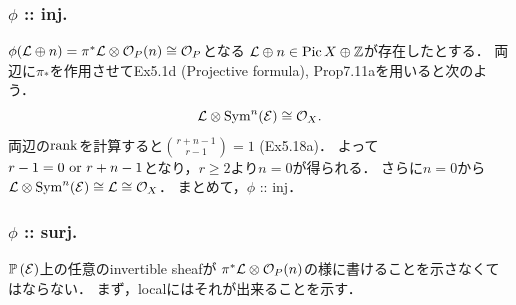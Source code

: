 \documentclass[a4paper]{jsarticle}
\newcommand{\Pic}{\operatorname{Pic}}
\newcommand{\pbundle}{\mathbb{P}\,}
\begin{document}
    \subsubsection{$\phi$ :: inj.}
    $\phi(\mathcal{L} \oplus n)=\pi^* \mathcal{L} \otimes \mathcal{O}_P(n) \cong \mathcal{O}_P$となる
    $\shL \oplus n \in \Pic X \oplus \Z$が存在したとする．
    両辺に$\pi_*$を作用させてEx5.1d (Projective formula), Prop7.11aを用いると次のよう．
    \[ \mathcal{L} \otimes \operatorname{Sym}^n(\mathcal{E}) \cong \mathcal{O}_X. \]
    両辺の$\operatorname{rank}$を計算すると$\binom{r+n-1}{r-1}=1$ (Ex5.18a)．
    よって$r-1=0 \text{ or } r+n-1$となり，$r \geq 2$より$n=0$が得られる．
    さらに$n=0$から$\mathcal{L} \otimes \operatorname{Sym}^n(\mathcal{E}) \cong \mathcal{L}\cong \mathcal{O}_X$．
    まとめて，$\phi$ :: inj．

    \subsubsection{$\phi$ :: surj.}
    $\pbundle(\shE)$上の任意のinvertible sheafが
    $\pi^* \mathcal{L} \otimes \mathcal{O}_P(n)$の様に書けることを示さなくてはならない．
    まず，localにはそれが出来ることを示す．
\end{document}

